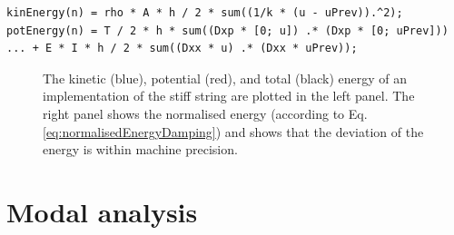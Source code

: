 {\begin{lstlisting}[caption=Calculating $\h$ for the simply supported boundary condition., label=alg:stiffStringEnergy]
% energy in the system
kinEnergy(n) = rho * A * h / 2 * sum((1/k * (u - uPrev)).^2);
potEnergy(n) = T / 2 * h * sum((Dxp * [0; u]) .* (Dxp * [0; uPrev])) ... + E * I * h / 2 * sum((Dxx * u) .* (Dxx * uPrev));
\end{lstlisting}

\begin{figure}[h]
    \centering
      \caption{The kinetic (blue), potential (red), and total (black) energy of an implementation of the stiff string are plotted in the left panel. The right panel shows the normalised energy (according to Eq. \eqref{eq:normalisedEnergyDamping}) and shows that the deviation of the energy is within machine precision. \label{fig:energyStiffString}}
\end{figure}

\section{Modal analysis}

}
